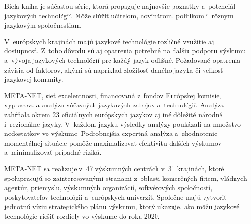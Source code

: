 Biela kniha je súčasťou série, ktorá propaguje najnovšie poznatky a~potenciál jazykových technológií. Môže slúžiť učiteľom, novinárom, politikom i~rôznym jazykovým spoločnostiam.

V~európskych krajinách majú jazykové technológie rozličné využitie aj dostupnosť. Z~toho dôvodu sú aj opatrenia potrebné na ďalšiu podporu výskumu a~vývoja jazykových technológií pre každý jazyk odlišné. Požadované opatrenia závisia od faktorov, akými sú napríklad zložitosť daného jazyka či veľkosť jazykovej komunity.

META-NET, sieť excelentnosti, financovaná z~fondov Európskej komisie, vypracovala analýzu súčasných jazykových zdrojov a~technológií. Analýza zahŕňala okrem 23 oficiálnych európskych jazykov aj iné dôležité národné i~regionálne jazyky. V~každom jazyku výsledky analýzy po\-uká\-zali na množstvo nedostatkov vo výs\-ku\-me. Podrobnejšia expertná analýza a~zhodnotenie momentálnej situácie po\-mô\-že maximalizovať efektivitu ďalších výskumov a~minimalizovať prípadné riziká.

META-NET sa realizuje v~47 výskumných centrách v~31 krajinách, ktoré spolupracujú so zainteresovanými stranami z~oblasti komerčných firiem, vládnych agentúr, priemyslu, výskumných organizácií, softvérových spoločností, poskytovateľov technológií a~európskych univerzít. Spoločne majú vytvoriť jednotnú víziu strategického plánu výskumu, ktorý ukazuje, ako môžu jazykové technológie riešiť rozdiely vo výskume do roku 2020.
